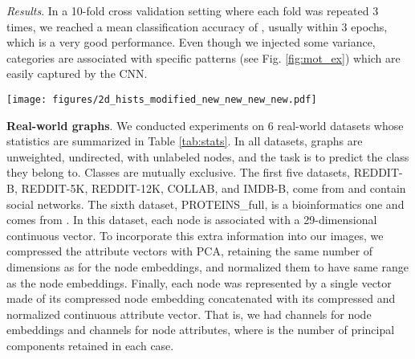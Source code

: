 \documentclass[runningheads]{llncs}
\begin{document}
\textit{Results}. In a 10-fold cross validation setting where each fold was repeated 3 times, we reached a mean classification accuracy of , usually within 3 epochs, which is a very good performance. Even though we injected some variance, categories are associated with specific patterns (see Fig. \ref{fig:mot_ex}) which are easily captured by the CNN.

\vspace{-0.4cm}

\begin{figure*}[h]
  \centering
    \texttt{[image: figures/2d\_hists\_modified\_new\_new\_new\_new.pdf]}
\captionsetup{justification=justified,singlelinecheck=false, size=small}
    \caption{Overlayed node embeddings in the space made of the first two eigenvectors of the adjacency matrices (first channel) and associated overlayed bivariate histograms for all graphs in the first four classes of the \textit{random} dataset.}
    \label{fig:mot_ex}
\end{figure*}

\vspace{-0.65cm}

\noindent \textbf{Real-world graphs}.
We conducted experiments on 6 real-world datasets whose statistics are summarized in Table \ref{tab:stats}. In all datasets, graphs are unweighted, undirected, with unlabeled nodes, and the task is to predict the class they belong to. Classes are mutually exclusive. The first five datasets, REDDIT-B, REDDIT-5K, REDDIT-12K, COLLAB, and IMDB-B, come from \cite{yanardag2015deep} and contain social networks. The sixth dataset, PROTEINS\_full, is a bioinformatics one and comes from \cite{KKMMN2016,borgwardt2005protein}. In this dataset, each node is associated with a 29-dimensional continuous vector. To incorporate this extra information into our images, we compressed the attribute vectors with PCA, retaining the same number of dimensions as for the node embeddings, and normalized them to have same range as the node embeddings. Finally, each node was represented by a single vector made of its compressed node embedding concatenated with its compressed and normalized continuous attribute vector. That is, we had  channels for node embeddings and  channels for node attributes, where  is the number of principal components retained in each case.

\vspace{-0.5cm}
\end{document}
